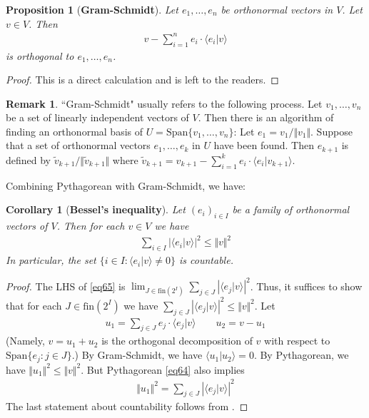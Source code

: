 \documentclass[12pt,b5paper,notitlepage]{article}
\theoremstyle{definition}
\newtheorem{rem}[df]{Remark}
\theoremstyle{plain}
\newtheorem{pp}[df]{Proposition}
\newtheorem{co}[df]{Corollary}
\newcommand{\wtd}{\widetilde}
\newcommand{\Span}{\mathrm{Span}}
\newcommand{\bk}[1]{\langle {#1}\rangle}
\newcommand{\fin}{\mathrm{fin}}
\numberwithin{equation}{section}
\begin{document}
\begin{pp}[\textbf{Gram-Schmidt}]
Let $e_1,\dots,e_n$ be orthonormal vectors in $V$. Let $v\in V$. Then
\begin{align}
v-\sum_{i=1}^n e_i\cdot \bk{e_i|v}
\end{align}
is orthogonal to $e_1,\dots,e_n$.
\end{pp}

\begin{proof}
This is a direct calculation and is left to the readers.
\end{proof}


\begin{rem}\label{lb117}
``Gram-Schmidt" usually refers to the following process. Let $v_1,\dots,v_n$ be a set of linearly independent vectors of $V$. Then there is an algorithm of finding an orthonormal basis of $U=\Span\{v_1,\dots,v_n\}$: Let $e_1=v_1/\Vert v_1\Vert$. Suppose that a set of orthonormal vectors $e_1,\dots,e_k$ in $U$ have been found. Then $e_{k+1}$ is defined by $\wtd v_{k+1}/\Vert\wtd v_{k+1}\Vert$ where $\wtd v_{k+1}=v_{k+1}-\sum_{i=1}^k e_i\cdot\bk{e_i|v_{k+1}}$.
\end{rem}



Combining Pythagorean with Gram-Schmidt, we have:
\begin{co}[\textbf{Bessel's inequality}]\label{lb118}
Let $(e_i)_{i\in I}$ be a family of orthonormal vectors of $V$. Then for each $v\in V$ we have
\begin{align}\label{eq65}
\sum_{i\in I}|\bk{e_i|v}|^2\leq \Vert v\Vert^2
\end{align}
In particular, the set $\{i\in I:\bk{e_i|v}\neq0\}$ is countable.
\end{co}




\begin{proof}
The LHS of \eqref{eq65} is $\lim_{J\in\fin(2^I)}\sum_{j\in J}|\bk{e_j|v}|^2$. Thus, it suffices to show that for each $J\in\fin(2^I)$ we have $\sum_{j\in J}|\bk{e_j|v}|^2\leq \Vert v\Vert^2$. Let 
\begin{align*}
u_1=\sum_{j\in J}e_j\cdot\bk{e_j|v} \qquad u_2=v-u_1
\end{align*}
(Namely, $v=u_1+u_2$ is the orthogonal decomposition of $v$ with respect to $\Span\{e_j:j\in J\}$.) By Gram-Schmidt, we have $\bk{u_1|u_2}=0$. By Pythagorean, we have $\Vert u_1\Vert^2\leq\Vert v\Vert^2$. But Pythagorean \eqref{eq64} also implies
\begin{align*}
\Vert u_1\Vert^2=\sum_{j\in J}|\bk{e_j|v}|^2
\end{align*}
The last statement about countability follows from .
\end{proof}
\end{document}
